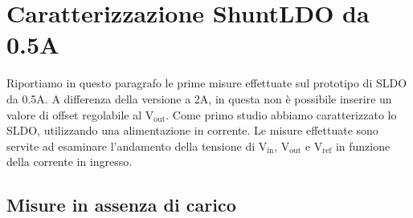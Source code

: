 
%



\section{Caratterizzazione ShuntLDO da 0.5A}

Riportiamo in questo paragrafo le prime misure effettuate sul prototipo di SLDO da 0.5A. A differenza della versione a 2A, in questa non è possibile inserire un valore di offset regolabile al $\mathrm{V_{out}}$.
Come primo studio abbiamo caratterizzato lo SLDO, utilizzando una alimentazione in corrente.
Le misure effettuate sono servite ad esaminare l'andamento della tensione di $\mathrm{V_{in}}$, $\mathrm{V_{out}}$ e $\mathrm{V_{ref}}$ in funzione della corrente in ingresso.

\subsection{Misure in assenza di carico}

